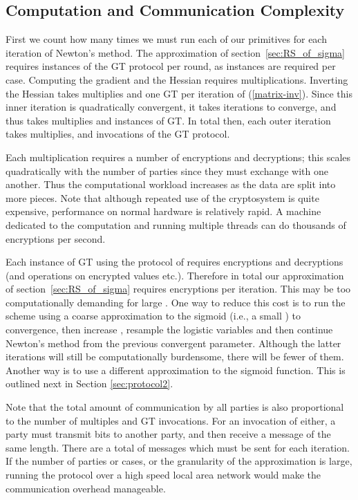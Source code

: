 \documentclass[11pt]{article}
\begin{document}
\subsection{Computation and Communication Complexity}\label{sec:complexity_1}

First we count how many times we must run each of our primitives for each iteration of Newton's method.  The approximation of section~\ref{sec:RS_of_sigma} requires  instances of the GT protocol per round, as  instances are required per case.  Computing the gradient and the Hessian requires  multiplications.
Inverting the Hessian takes  multiplies and one GT per iteration of (\ref{matrix-inv}).  Since this inner iteration is quadratically convergent, it takes  iterations to converge, and thus takes  multiplies and  instances of GT. In total then, each outer iteration takes  multiplies, and  invocations of the GT protocol.

Each multiplication requires a number of encryptions and decryptions;  this scales quadratically with the number of parties  since they must exchange with one another.  Thus the computational workload increases as the data are split into more pieces.  Note that although repeated use of the cryptosystem is quite expensive, performance  on normal hardware is relatively rapid.  A machine  dedicated to the computation and running multiple threads can do thousands of encryptions per  second.

Each instance of GT using the protocol of \cite{gt_proto} requires  encryptions and decryptions (and operations on encrypted values etc.).  Therefore in total our approximation of section~\ref{sec:RS_of_sigma} requires  encryptions per iteration.  This may be too computationally demanding for large .  One way to reduce this cost is to run the scheme using a coarse approximation to the sigmoid (i.e., a small ) to convergence, then increase , resample the logistic variables and then continue Newton's method from the previous convergent parameter.  Although the latter iterations will still be computationally burdensome, there will be fewer of them. Another way is to use a different approximation to the sigmoid function. This is outlined next in Section \ref{sec:protocol2}.

Note that the total amount of communication by all parties is also proportional to the number of multiples and GT invocations.  For an invocation of either, a party must transmit  bits to another party, and then receive a message of the same length. There are a total of  messages which must be sent for each iteration.  If  the number of parties or cases, or the granularity of the approximation is large,   running the protocol over a high speed local area network would make the communication overhead manageable.
\end{document}
